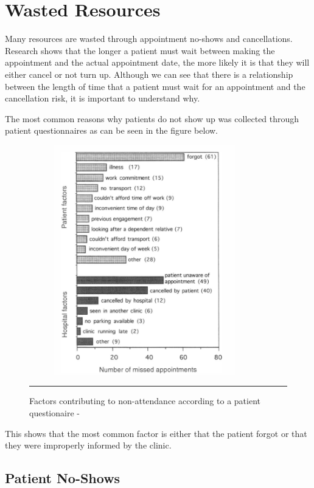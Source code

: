 \section{Wasted Resources}

Many resources are wasted through appointment no-shows and cancellations. Research shows that the longer a patient must wait between making the appointment and the actual appointment date, the more likely it is that they will either cancel or not turn up\cite{Gallucci}. Although we can see that there is a relationship between the length of time that a patient must wait for an appointment and the cancellation risk, it is important to understand why.

The most common reasons why patients do not show up was collected through patient questionnaires as can be seen in the figure below.

\begin{figure}[htbp]
	\centering	\includegraphics[width=10cm,height=10cm,keepaspectratio]{Figures/MissedAppointmentsStoneEtAl.png}
		\rule{35em}{0.5pt}
	\caption[Factors contributing to non-attendance according to a patient questionaire - \cite{Stone}]{Factors contributing to non-attendance according to a patient questionaire - \cite{Stone}}
	\label{fig:NonAttendance}
\end{figure}

This shows that the most common factor is either that the patient forgot or that they were improperly informed by the clinic.

\subsection{Patient No-Shows}

